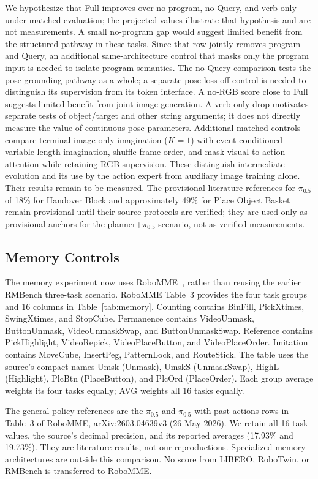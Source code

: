 We hypothesize that Full improves over no program, no Query, and verb-only under matched evaluation; the projected values illustrate that hypothesis and are not measurements. A small no-program gap would suggest limited benefit from the structured pathway in these tasks. Since that row jointly removes program and Query, an additional same-architecture control that masks only the program input is needed to isolate program semantics. The no-Query comparison tests the pose-grounding pathway as a whole; a separate pose-loss-off control is needed to distinguish its supervision from its token interface. A no-RGB score close to Full suggests limited benefit from joint image generation. A verb-only drop motivates separate tests of object/target and other string arguments; it does not directly measure the value of continuous pose parameters. Additional matched controls compare terminal-image-only imagination ($K=1$) with event-conditioned variable-length imagination, shuffle frame order, and mask visual-to-action attention while retaining RGB supervision. These distinguish intermediate evolution and its use by the action expert from auxiliary image training alone. Their results remain to be measured. The provisional literature references for $\pi_{0.5}$ of 18\% for Handover Block and approximately 49\% for Place Object Basket remain provisional until their source protocols are verified; they are used only as provisional anchors for the planner+$\pi_{0.5}$ scenario, not as verified measurements.
\subsection{Memory Controls}
\label{app:memory}
The memory experiment now uses RoboMME~\cite{robomme}, rather than reusing the earlier RMBench three-task scenario. RoboMME Table~3 provides the four task groups and 16 columns in Table~\ref{tab:memory}. Counting contains BinFill, PickXtimes, SwingXtimes, and StopCube. Permanence contains VideoUnmask, ButtonUnmask, VideoUnmaskSwap, and ButtonUnmaskSwap. Reference contains PickHighlight, VideoRepick, VideoPlaceButton, and VideoPlaceOrder. Imitation contains MoveCube, InsertPeg, PatternLock, and RouteStick. The table uses the source's compact names Umsk (Unmask), UmskS (UnmaskSwap), HighL (Highlight), PlcBtn (PlaceButton), and PlcOrd (PlaceOrder). Each group average weights its four tasks equally; AVG weights all 16 tasks equally.

The general-policy references are the $\pi_{0.5}$ and $\pi_{0.5}$ with past actions rows in Table~3 of RoboMME, arXiv:2603.04639v3 (26 May 2026). We retain all 16 task values, the source's decimal precision, and its reported averages (17.93\% and 19.73\%). They are literature results, not our reproductions. Specialized memory architectures are outside this comparison. No score from LIBERO, RoboTwin, or RMBench is transferred to RoboMME.


